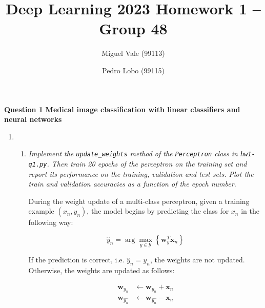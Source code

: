 \documentclass[12pt]{article}
\title{\large{Deep Learning 2023}\vskip 0.2cm Homework 1 -- Group 48}
\date{}
\author{Miguel Vale (99113) \and Pedro Lobo (99115)}
\begin{document}
\maketitle
\center\large{\vskip -1.0cm\textbf{Question 1}}
\center\textbf{Medical image classification with linear classifiers and neural networks}
\begin{enumerate}[leftmargin=\labelsep]

    \item
          \begin{enumerate}[label=\alph*)]

              \item \textit{Implement the \texttt{update\_weights} method of the \texttt{Perceptron} class in \texttt{hw1-q1.py}. Then train 20 epochs of the perceptron on the training set and report its performance on the training, validation and test sets. Plot the train and validation accuracies as a function of the epoch number.}

                    \vspace{12pt}

                    During the weight update of a multi-class perceptron, given a training example $(x_n, y_n)$, the model begins by predicting the class for $x_n$ in the following way:

                    \begin{equation}
                        \hat{y}_n = \arg\max_{y \in \mathcal{Y}} \left\{ \mathbf{w}_y^T \mathbf{x}_n \right\}
                    \end{equation}

                    \vspace{12pt}

                    If the prediction is correct, i.e. $\hat{y}_n = y_n$, the weights are not updated. Otherwise, the weights are updated as follows:

                    \begin{equation}
                        \begin{aligned}
                            \mathbf{w}_{y_n}       & \leftarrow \mathbf{w}_{y_n} + \mathbf{x}_n       \\
                            \mathbf{w}_{\hat{y_n}} & \leftarrow \mathbf{w}_{\hat{y_n}} - \mathbf{x}_n
                        \end{aligned}
                    \end{equation}

                    \vspace{12pt}


\end{enumerate}
\end{enumerate}
\end{document}
